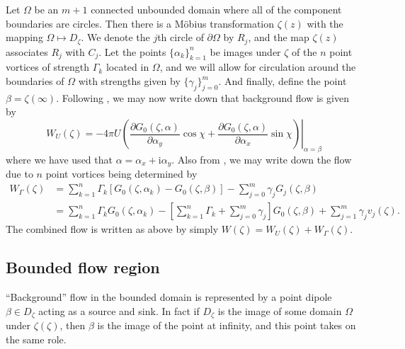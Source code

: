 \documentclass[12pt,fleqn]{article}
\renewcommand{\i}{\mathrm{i}}
\begin{document}
Let $\Omega$ be an $m+1$ connected unbounded domain where all of the component boundaries are circles. Then there is a M\"obius transformation $\zeta(z)$ with the mapping $\Omega\mapsto D_\zeta$. We denote the $j$th circle of $\partial\Omega$ by $R_j$, and the map $\zeta(z)$ associates $R_j$ with $C_j$. Let the points $\{\alpha_k\}_{k=1}^n$ be images under $\zeta$ of the $n$ point vortices of strength $\Gamma_k$ located in $\Omega$, and we will allow for circulation around the boundaries of $\Omega$ with strengths given by $\{\gamma_j\}_{j=0}^m$. And finally, define the point $\beta = \zeta(\infty)$. Following \cite{newcalculus}, we may now write down that background flow is given by
\begin{equation}
  W_U(\zeta) = -4\pi U\left. \left( \frac{\partial G_0(\zeta,\alpha)}{\partial \alpha_y}\cos\chi + \frac{\partial G_0(\zeta,\alpha)}{\partial \alpha_x}\sin\chi \right) \right|_{\alpha = \beta}
  \label{eq:backgroudmc}
\end{equation}
where we have used that $\alpha = \alpha_x + \i\alpha_y$. Also from \cite{newcalculus}, we may write down the flow due to $n$ point vortices being determined by
\begin{equation}
  \begin{split}
    W_\Gamma(\zeta) &= \sum_{k=1}^n \Gamma_k \left[ G_0(\zeta,\alpha_k) - G_0(\zeta,\beta) \right] - \sum_{j=0}^m \gamma_j G_j(\zeta,\beta) \\
    &= \sum_{k=1}^n \Gamma_k G_0(\zeta,\alpha_k) - \left[ \sum_{k=1}^n \Gamma_k + \sum_{j=0}^m \gamma_j \right] G_0(\zeta,\beta) + \sum_{j=1}^m \gamma_j v_j(\zeta).
  \end{split}
  \label{eq:vorticesmc}
\end{equation}
The combined flow is written as above by simply $W(\zeta) = W_U(\zeta) + W_\Gamma(\zeta)$.

\subsection{Bounded flow region}
``Background'' flow in the bounded domain is represented by a point dipole $\beta\in D_\zeta$ acting as a source and sink. In fact if $D_\zeta$ is the image of some domain $\Omega$ under $\zeta(\zeta)$, then $\beta$ is the image of the point at infinity, and this point takes on the same role.
\end{document}
